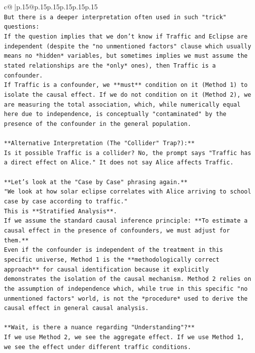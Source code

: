 \documentclass{article}
\begin{document}
{\begin{supertabular}{c@{$\;$}|p{.15\linewidth}@{}p{.15\linewidth}p{.15\linewidth}p{.15\linewidth}p{.15\linewidth}p{.15\linewidth}}
{{{\\ 
\texttt{But there is a deeper interpretation often used in such "trick" questions:} \\
\texttt{If the question implies that we don't know if Traffic and Eclipse are independent (despite the "no unmentioned factors" clause which usually means no *hidden* variables, but sometimes implies we must assume the stated relationships are the *only* ones), then Traffic is a confounder.} \\
\texttt{If Traffic is a confounder, we **must** condition on it (Method 1) to isolate the causal effect. If we do not condition on it (Method 2), we are measuring the total association, which, while numerically equal here due to independence, is conceptually "contaminated" by the presence of the confounder in the general population.} \\
\\ 
\texttt{**Alternative Interpretation (The "Collider" Trap?):**} \\
\texttt{Is it possible Traffic is a collider? No, the prompt says "Traffic has a direct effect on Alice." It does not say Alice affects Traffic.} \\
\\ 
\texttt{**Let's look at the "Case by Case" phrasing again.**} \\
\texttt{"We look at how solar eclipse correlates with Alice arriving to school case by case according to traffic."} \\
\texttt{This is **Stratified Analysis**.} \\
\texttt{If we assume the standard causal inference principle: **To estimate a causal effect in the presence of confounders, we must adjust for them.**} \\
\texttt{Even if the confounder is independent of the treatment in this specific universe, Method 1 is the **methodologically correct approach** for causal identification because it explicitly demonstrates the isolation of the causal mechanism. Method 2 relies on the assumption of independence which, while true in this specific "no unmentioned factors" world, is not the *procedure* used to derive the causal effect in general causal analysis.} \\
\\ 
\texttt{**Wait, is there a nuance regarding "Understanding"?**} \\
\texttt{If we use Method 2, we see the aggregate effect. If we use Method 1, we see the effect under different traffic conditions.} \\
}}}
\end{supertabular}}
\end{document}
